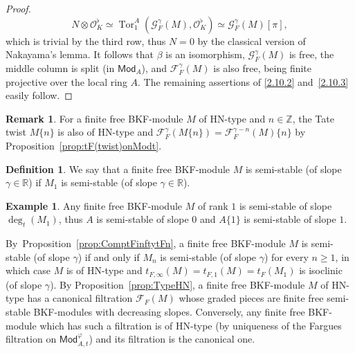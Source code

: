 \documentclass[11pt]{article}
\theoremstyle{definition}
\newtheorem{defi}[theo]{Definition}
\newtheorem{example}[theo]{Example}
\newtheorem{rema}[theo]{Remark}
\numberwithin{equation}{section}
\numberwithin{figure}{section}
\numberwithin{table}{section}
\newcommand{\Mod}{\mathsf{Mod}}
\DeclareMathOperator{\Tor}{Tor}
\begin{document}
\begin{proof}
\[
N\otimes\mathcal{O}_{K}^{\flat}\simeq\Tor_{1}^{A}\left(\mathcal{G}_{F}^{\gamma}(M),\mathcal{O}_{K}^{\flat}\right)\simeq\mathcal{G}_{F}^{\gamma}(M)[\pi],
\]
which is trivial by the third row, thus $N=0$ by the classical version of Nakayama's lemma. It follows that $\beta$ is an isomorphism, $\mathcal{G}_{F}^{\gamma}(M)$ is free, the middle column is split (in $\Mod_{A}$), and $\mathcal{F}_{F}^{\gamma}(M)$ is also free, being finite projective over the local ring $A$. The remaining assertions of \eqref{2.10.2} and~\eqref{2.10.3} easily follow.
\end{proof}

\begin{rema}
For a finite free BKF-module $M$ of HN-type and $n\in\mathbb{Z}$, the Tate twist $M\{n\}$ is also of HN-type and $\mathcal{F}_{F}^{\gamma}(M\{n\})=\mathcal{F}_{F}^{\gamma-n}(M)\{n\}$ by Proposition~\ref{prop:tF(twist)onModt}.
\end{rema}

\begin{defi}
We say that a finite free BKF-module $M$ is semi-stable (of slope $\gamma\in\mathbb{R}$) if $M_{1}$ is semi-stable (of slope $\gamma\in\mathbb{R}$).
\end{defi}

\begin{example}
Any finite free BKF-module $M$ of rank $1$ is semi-stable of slope $\deg_{t}(M_{1})$, thus $A$ is semi-stable of slope $0$ and $A\{1\}$ is semi-stable of slope $1$.
\end{example}

By~Proposition~\ref{prop:ComptFinftytFn}, a finite free BKF-module $M$ is semi-stable (of slope $\gamma$) if and only if $M_{n}$ is semi-stable (of slope $\gamma$) for every $n\geq1$, in which case $M$ is of HN-type and $t_{F,\infty}(M)=t_{F,1}(M)=t_{F}(M_{1})$ is isoclinic (of slope $\gamma$). By Proposition~\ref{prop:TypeHN}, a finite free BKF-module $M$ of HN-type has a canonical filtration $\mathcal{F}_{F}(M)$ whose graded pieces are finite free semi-stable BKF-modules with decreasing slopes. Conversely, any finite free BKF-module which has such a filtration is of HN-type (by uniqueness of the Fargues filtration on $\Mod_{A,t}^{\varphi}$) and its filtration is the canonical one.

\subsubsection{}\label{subsec:DefFullSubCatHNType}
\end{document}
